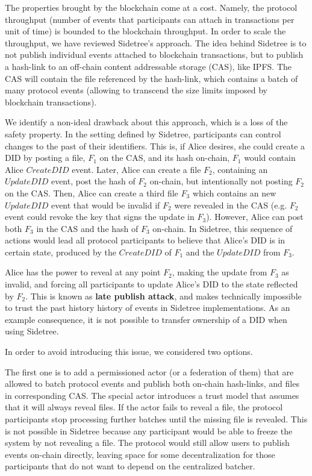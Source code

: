\documentclass[10pt,a4paper]{article}
\begin{document}
The properties brought by the blockchain come at a cost. Namely, the protocol throughput (number of events that participants can attach in 
transactions per unit of time) is bounded to the blockchain throughput. In order to scale the throughput, we have reviewed Sidetree's approach. The 
idea behind Sidetree is to not publish individual events attached to blockchain transactions, but to publish a hash-link to an off-chain content 
addressable storage (CAS), like IPFS. The CAS will contain the file referenced by the hash-link, which contains a batch of many protocol events 
(allowing to transcend the size limits imposed by blockchain transactions).

We identify a non-ideal drawback about this approach, which is a loss of the safety property. In the setting defined by Sidetree, participants can 
control changes to the past of their identifiers. This is, if Alice desires, she could create a DID by posting a file, $F_{1}$ on the CAS, and its 
hash on-chain, $F_{1}$ would contain Alice $CreateDID$ event. Later, Alice can create a file $F_{2}$, containing an $UpdateDID$ event, post the hash 
of $F_{2}$ on-chain, but intentionally not posting $F_{2}$ on the CAS. Then, Alice can create a third file $F_{3}$ which contains an new $UpdateDID$
event that would be invalid if $F_{2}$ were revealed in the CAS (e.g. $F_{2}$ event could revoke the key that signs the update in $F_{3}$). However, 
Alice can post both $F_{3}$ in the CAS and the hash of $F_{3}$ on-chain. In Sidetree, this sequence of actions would lead all protocol participants 
to believe that Alice's DID is in certain state, produced by the $CreateDID$ of $F_{1}$ and the $UpdateDID$ from $F_{3}$.

Alice has the power to reveal at any point $F_{2}$, making the update from $F_{3}$ as invalid, and forcing all participants to update Alice's
DID to the state reflected by $F_{2}$. This is known as \textbf{late publish attack}, and makes technically impossible to trust the past history 
history of events in Sidetree implementations. As an example consequence, it is not possible to transfer ownership of a DID when using Sidetree.

In order to avoid introducing this issue, we considered two options. 

The first one is to add a permissioned actor (or a federation of them) that are allowed to batch protocol events and publish both on-chain hash-links,
and files in corresponding CAS. The special actor introduces a trust model that assumes that it will always reveal files. If the actor fails to 
reveal a file, the protocol participants stop processing further batches until the missing file is revealed. This is not possible in Sidetree because
any participant would be able to freeze the system by not revealing a file. The protocol would still allow users to publish events on-chain directly, 
leaving space for some decentralization for those participants that do not want to depend on the centralized batcher. 
\end{document}

